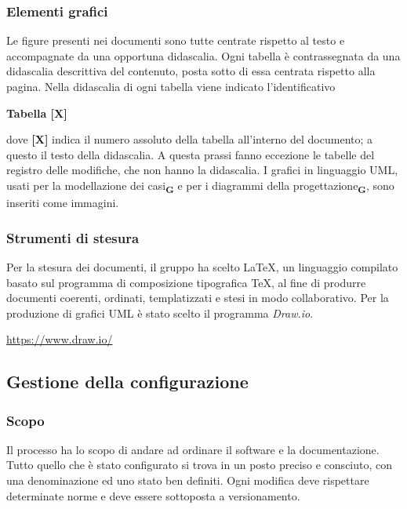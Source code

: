         \subsubsection{Elementi grafici}
            Le figure presenti nei documenti sono tutte centrate rispetto al testo e accompagnate da una opportuna didascalia.
            Ogni tabella è contrassegnata da una didascalia descrittiva del contenuto, posta sotto di essa centrata rispetto alla pagina.  Nella didascalia di ogni tabella viene indicato l’identificativo
            \begin{center}
                \textbf{Tabella [X]}
            \end{center}
            dove \textbf{[X]} indica il numero assoluto della tabella all’interno del documento; a questo il testo della didascalia. A questa prassi fanno eccezione le tabelle del registro delle modifiche, che non hanno la didascalia.
            I grafici in linguaggio UML, usati per la modellazione dei casi\textsubscript{\textbf{G}} e per i diagrammi della progettazione\textsubscript{\textbf{G}}, sono inseriti come immagini.
        \subsubsection{Strumenti di stesura}
            \subsubsubsection{\LaTeX}
            Per la stesura dei documenti, il gruppo ha scelto \LaTeX, un linguaggio compilato basato sul programma di composizione tipografica \TeX, al fine di produrre documenti coerenti, ordinati, templatizzati e stesi in modo collaborativo.
            Per la produzione di grafici UML è stato scelto il programma \textit{Draw.io}.
            \begin{center}
                \href{https://www.draw.io/}{https://www.draw.io/}\\
            \end{center}
    \subsection{Gestione della configurazione}
        \subsubsection{Scopo}
        Il processo ha lo scopo di andare ad ordinare il software e la documentazione. Tutto quello che è stato configurato si trova in un posto preciso e consciuto, con una denominazione ed uno stato ben definiti. Ogni modifica deve rispettare determinate norme e deve essere sottoposta a versionamento.
